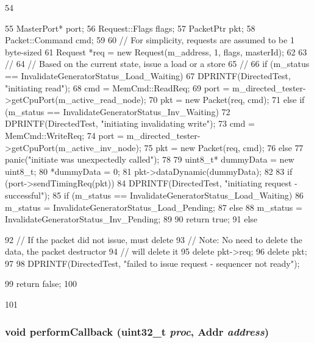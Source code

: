 \begin{DoxyCode}
54 {
55     MasterPort* port;
56     Request::Flags flags;
57     PacketPtr pkt;
58     Packet::Command cmd;
59 
60     // For simplicity, requests are assumed to be 1 byte-sized
61     Request *req = new Request(m_address, 1, flags, masterId);
62 
63     //
64     // Based on the current state, issue a load or a store
65     //
66     if (m_status == InvalidateGeneratorStatus_Load_Waiting) {
67         DPRINTF(DirectedTest, "initiating read\n");
68         cmd = MemCmd::ReadReq;
69         port = m_directed_tester->getCpuPort(m_active_read_node);
70         pkt = new Packet(req, cmd);
71     } else if (m_status == InvalidateGeneratorStatus_Inv_Waiting) {
72         DPRINTF(DirectedTest, "initiating invalidating write\n");
73         cmd = MemCmd::WriteReq;
74         port = m_directed_tester->getCpuPort(m_active_inv_node);
75         pkt = new Packet(req, cmd);
76     } else {
77         panic("initiate was unexpectedly called\n");
78     }
79     uint8_t* dummyData = new uint8_t;
80     *dummyData = 0;
81     pkt->dataDynamic(dummyData);
82 
83     if (port->sendTimingReq(pkt)) {
84         DPRINTF(DirectedTest, "initiating request - successful\n");
85         if (m_status == InvalidateGeneratorStatus_Load_Waiting) {
86             m_status = InvalidateGeneratorStatus_Load_Pending;
87         } else {
88             m_status = InvalidateGeneratorStatus_Inv_Pending;
89         }
90         return true;
91     } else {
92         // If the packet did not issue, must delete
93         // Note: No need to delete the data, the packet destructor
94         // will delete it
95         delete pkt->req;
96         delete pkt;
97 
98         DPRINTF(DirectedTest, "failed to issue request - sequencer not ready\n");
      
99         return false;
100     }
101 }
\end{DoxyCode}
\hypertarget{classInvalidateGenerator_a8c30329193052bf044bac8ee3e075475}{
\subsubsection[{performCallback}]{\setlength{\rightskip}{0pt plus 5cm}void performCallback ({\bf uint32\_\-t} {\em proc}, \/  {\bf Addr} {\em address})}}
\label{classInvalidateGenerator_a8c30329193052bf044bac8ee3e075475}


